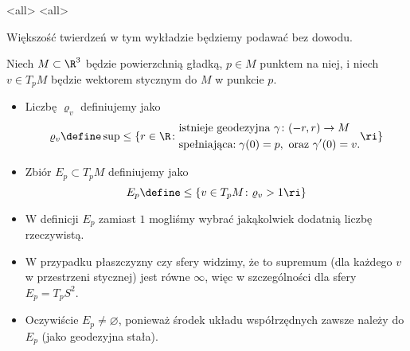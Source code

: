 \mode*
\mode<all>{}
\mode<all>{}

\begin{frame}
Większość twierdzeń w tym wykładzie będziemy podawać bez dowodu.
\begin{definicja}
Niech $M\subset \R^3$ będzie powierzchnią gładką, $p\in M$ punktem na niej, i niech $v\in T_pM$ będzie wektorem stycznym do $M$ w punkcie $p$. 
\begin{itemize}
\pause \item Liczbę $\varrho_v$ definiujemy jako
\[\varrho_v\define \sup
\le\{r\in \R\colon \begin{aligned}
&\text{istnieje geodezyjna } \gamma\colon(-r,r)\to M\\
&\text{spełniająca:}\;\gamma(0)=p,\text{ oraz }\gamma'(0)=v.
\end{aligned}\ri\}\]
\pause \item Zbiór $E_p\subset T_pM$ definiujemy jako
\[E_{p}\define \le\{v\in T_pM\colon \varrho_v>1\ri\}\]
\end{itemize}
\end{definicja}
\end{frame}
\begin{frame}[<+->]

\begin{uwaga}
\begin{itemize}
\item W definicji $E_p$ zamiast $1$ mogliśmy wybrać jakąkolwiek dodatnią liczbę rzeczywistą.
\item W przypadku płaszczyzny czy sfery widzimy, że to supremum (dla każdego $v$ w przestrzeni stycznej) jest równe $\infty$, więc w szczególności dla sfery $E_p=T_pS^2$.
\item Oczywiście $E_p\neq \varnothing$, ponieważ środek układu współrzędnych zawsze należy do $E_p$ (jako geodezyjna stała).
\end{itemize}

\end{uwaga}

\end{frame}
